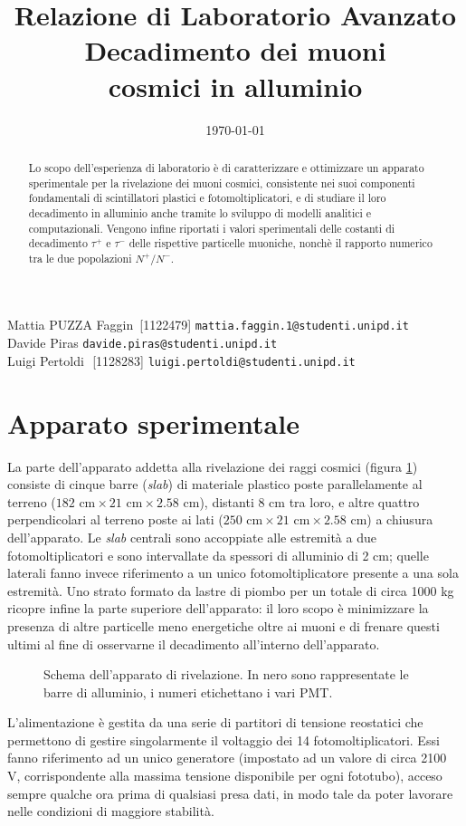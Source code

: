 \documentclass[11pt, oneside, a4paper]{article}   	%
\title{\normalsize{Relazione di Laboratorio Avanzato}\\\huge{Decadimento dei muoni \\ cosmici in alluminio}}
\date{\today}
\begin{document}
\maketitle
\thispagestyle{empty}
%
\vspace{3cm}
\begin{abstract}
	Lo scopo dell'esperienza di laboratorio è di caratterizzare e ottimizzare un apparato sperimentale per la rivelazione dei muoni cosmici, consistente nei suoi componenti fondamentali di scintillatori plastici e fotomoltiplicatori, e di studiare il loro decadimento in alluminio anche tramite lo sviluppo di modelli analitici e computazionali. Vengono infine riportati i valori sperimentali delle costanti di decadimento $\tau^+$ e $\tau^-$ delle rispettive particelle muoniche, nonchè il rapporto numerico tra le due popolazioni $N^+/N^-$.
\end{abstract}
\vspace{8cm}
Mattia PUZZA Faggin \;\,[1122479] \texttt{mattia.faggin.1@studenti.unipd.it} \\
Davide Piras \;\;\;\:[1114287] \texttt{davide.piras@studenti.unipd.it} \\
Luigi Pertoldi \;\,\,[1128283] \texttt{luigi.pertoldi@studenti.unipd.it}
\cleardoublepage
%
\tableofcontents
\clearpage
\listoffigures
\listoftables
%
\clearpage
\section{Apparato sperimentale}
La parte dell'apparato addetta alla rivelazione dei raggi cosmici (figura \ref{appScheme}) consiste di cinque barre (\emph{slab}) di materiale plastico poste parallelamente al terreno ($182 \text{ cm}\times21\text{ cm}\times2.58$ cm), distanti 8 cm tra loro, e altre quattro perpendicolari al terreno poste ai lati ($250\text{ cm}\times21\text{ cm}\times2.58$ cm) a chiusura dell'apparato. Le \emph{slab} centrali sono accoppiate alle estremità a due fotomoltiplicatori e sono intervallate da spessori di alluminio di 2 cm; quelle laterali fanno invece riferimento a un unico fotomoltiplicatore presente a una sola estremità. Uno strato formato da lastre di piombo per un totale di circa 1000 kg ricopre infine la parte superiore dell'apparato: il loro scopo è minimizzare la presenza di altre particelle meno energetiche oltre ai muoni e di frenare questi ultimi al fine di osservarne il decadimento all'interno dell'apparato.
%
\begin{figure}[h]
	\centering
		
	\caption{Schema dell'apparato di rivelazione. In nero sono rappresentate le barre di alluminio, i numeri etichettano i vari PMT.}
	\label{appScheme}
\end{figure}
%
L'alimentazione è gestita da una serie di partitori di tensione reostatici che permettono di gestire singolarmente il voltaggio dei 14 fotomoltiplicatori. Essi fanno riferimento ad un unico generatore (impostato ad un valore di circa 2100 V, corrispondente alla massima tensione disponibile per ogni fototubo), acceso sempre qualche ora prima di qualsiasi presa dati, in modo tale da poter lavorare nelle condizioni di maggiore stabilità.
\end{document}
